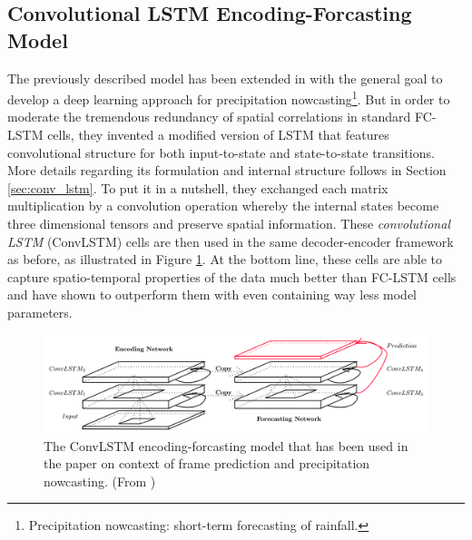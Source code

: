\subsection{Convolutional LSTM Encoding-Forcasting Model}

The previously described model has been extended in \parencite{conv_lstm_nowcasting} with the general goal to develop a deep learning approach for precipitation nowcasting\footnote{Precipitation nowcasting: short-term forecasting of rainfall.}. But in order to moderate the tremendous redundancy of spatial correlations in standard FC-LSTM cells, they invented a modified version of LSTM that features convolutional structure for both input-to-state and state-to-state transitions. More details regarding its formulation and internal structure follows in Section \ref{sec:conv_lstm}. To put it in a nutshell, they exchanged each matrix multiplication by a convolution operation whereby the internal states become three dimensional tensors and preserve spatial information. These \textit{convolutional LSTM} (ConvLSTM) cells are then used in the same decoder-encoder framework as before, as illustrated in Figure \ref{fig:convlstm_model}. At the bottom line, these cells are able to capture spatio-temporal properties of the data much better than FC-LSTM cells and have shown to outperform them with even containing way less model parameters.

\begin{figure}[htb]
	\centering
	\includegraphics[width=0.8\linewidth]{figures/related/nowcasting_model.png} 
	\caption[ConvLSTM Encoding-Forecasting Model]{The ConvLSTM encoding-forcasting model that has been used in the paper on context of frame prediction and precipitation nowcasting. (From \parencite{conv_lstm_nowcasting})} \label{fig:convlstm_model}
\end{figure}

